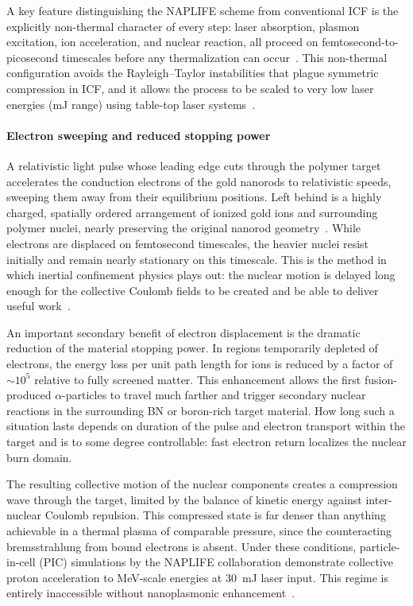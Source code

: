 \documentclass[particles,article,accept,pdftex,moreauthors]{Definitions/mdpi}
\begin{document}
A key feature distinguishing the NAPLIFE scheme from conventional ICF is the explicitly non-thermal character of every step: laser absorption, plasmon excitation, ion acceleration, and nuclear reaction, all proceed on femtosecond-to-picosecond timescales before any thermalization can occur~\cite{Csernai:2025EPJ}. This non-thermal configuration avoids the Rayleigh--Taylor instabilities that plague symmetric compression in ICF, and it allows the process to be scaled to very low laser energies (mJ range) using table-top laser systems~\cite{Biro:2023Univ}.

\paragraph*{\bf Electron sweeping and reduced stopping power}
A relativistic light pulse whose leading edge cuts through the polymer target accelerates the conduction electrons of the gold nanorods to relativistic speeds, sweeping them away from their equilibrium positions. Left behind is a highly charged, spatially ordered arrangement of ionized gold ions and surrounding polymer nuclei, nearly preserving the original nanorod geometry~\cite{Papp:2022PRXEnergy}. While electrons are displaced on femtosecond timescales, the heavier nuclei resist initially and remain nearly stationary on this timescale. This is the method in which inertial confinement physics plays out: the nuclear motion is delayed long enough for the collective Coulomb fields to be created and be able to deliver useful work~\cite{Zweiback:00Coul}.

An important secondary benefit of electron displacement is the dramatic reduction of the material stopping power. In regions temporarily depleted of electrons, the energy loss per unit path length for ions is reduced by a factor of ${\sim}10^5$ relative to fully screened matter. This enhancement allows the first fusion-produced $\alpha$-particles to travel much farther and trigger secondary nuclear reactions in the surrounding BN or boron-rich target material. How long such a situation lasts depends on duration of the pulse and electron transport within the target and is to some degree controllable: fast electron return localizes the nuclear burn domain.

The resulting collective motion of the nuclear components creates a compression wave through the target, limited by the balance of kinetic energy against inter-nuclear Coulomb repulsion. This compressed state is far denser than anything achievable in a thermal plasma of comparable pressure, since the counteracting bremsstrahlung from bound electrons is absent. Under these conditions, particle-in-cell (PIC) simulations by the NAPLIFE collaboration demonstrate collective proton acceleration to MeV-scale energies at 30~mJ laser input. This regime is entirely inaccessible without nanoplasmonic enhancement~\cite{Papp:2023arXiv}.
\end{document}
